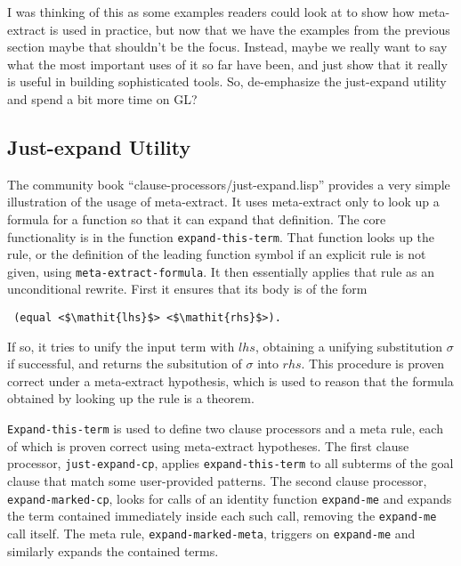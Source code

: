 

\begin{mycomment}
  I was thinking of this as some examples readers could look at to
  show how meta-extract is used in practice, but now that we have the
  examples from the previous section maybe that shouldn't be the
  focus.  Instead, maybe we really want to say what the most important
  uses of it so far have been, and just show that it really is useful
  in building sophisticated tools.  So, de-emphasize the just-expand
  utility and spend a bit more time on GL?
\end{mycomment}

\subsection{Just-expand Utility}

The community book ``clause-processors/just-expand.lisp'' provides a
very simple illustration of the usage of meta-extract.  It uses
meta-extract only to look up a formula for a function so that it can
expand that definition.  The core functionality is in the function
\texttt{expand-this-term}.  That function looks up the rule, or the
definition of the leading function symbol if an explicit rule is not
given, using \texttt{meta-extract-formula}.  It then essentially
applies that rule as an unconditional rewrite.  First it ensures that
its body is of the form
\begin{lstlisting}
 (equal <$\mathit{lhs}$> <$\mathit{rhs}$>).
\end{lstlisting}
If so, it tries to unify the input term with $\mathit{lhs}$, obtaining
a unifying substitution $\sigma$ if successful, and returns the
subsitution of $\sigma$ into $\mathit{rhs}$.  This procedure is proven
correct under a meta-extract hypothesis, which is used to reason that
the formula obtained by looking up the rule is a theorem.

\texttt{Expand-this-term} is used to define two clause processors and
a meta rule, each of which is proven correct using meta-extract
hypotheses.  The first clause processor, \texttt{just-expand-cp},
applies \texttt{expand-this-term} to all subterms of the goal clause
that match some user-provided patterns.  The second clause processor,
\texttt{expand-marked-cp}, looks for calls of an identity function
\texttt{expand-me} and expands the term contained immediately inside
each such call, removing the \texttt{expand-me} call itself.  The meta
rule, \texttt{expand-marked-meta}, triggers on \texttt{expand-me} and
similarly expands the contained terms.

